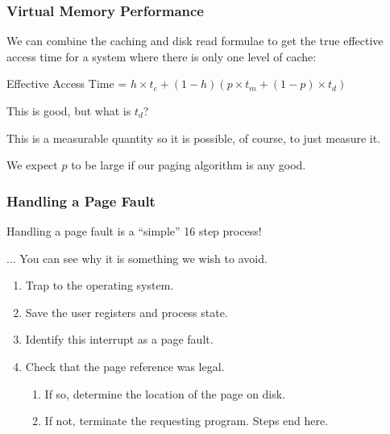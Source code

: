 \begin{frame}
\frametitle{Virtual Memory Performance}

We can combine the caching and disk read formulae to get the true effective access time for a system where there is only one level of cache:

\begin{center}
	Effective Access Time = $ h \times t_{c} + (1 - h) ( p \times t_{m} + (1 - p) \times t_{d})$
\end{center}

This is good, but what is $t_{d}$? 

This is a measurable quantity so it is possible, of course, to just measure it.

We expect $p$ to be large if our paging algorithm is any good.

\end{frame}



\begin{frame}
\frametitle{Handling a Page Fault}

Handling a page fault is a ``simple'' 16 step process!

... You can see why it is something we wish to avoid.

\begin{enumerate}
	\item Trap to the operating system.
	\item Save the user registers and process state.
	\item Identify this interrupt as a page fault.
	\item Check that the page reference was legal. 
	\begin{enumerate}
		\item If so, determine the location of the page on disk.
		\item If not, terminate the requesting program. Steps end here.
	\end{enumerate}
	\setcounter{pf}{\theenumi}
\end{enumerate}

\end{frame}

